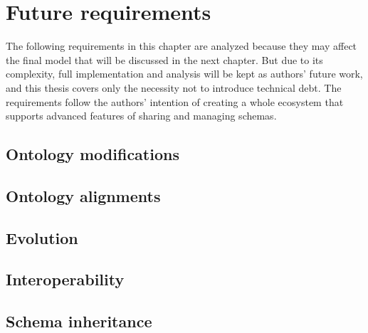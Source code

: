 





\chapter{Future requirements}\label{chapters:future-requirements}

The following requirements in this chapter are analyzed because they may affect the final model that will be discussed in the next chapter. But due to its complexity, full implementation and analysis will be kept as authors' future work, and this thesis covers only the necessity not to introduce technical debt. The requirements follow the authors' intention of creating a whole ecosystem that supports advanced features of sharing and managing schemas.

\section{Ontology modifications}


\section{Ontology alignments}


\section{Evolution}


\section{Interoperability}


\section{Schema inheritance}
